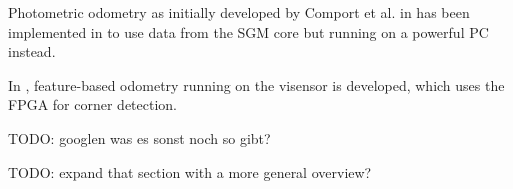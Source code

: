 Photometric odometry as initially developed by Comport et al. in
\cite{comport2007odometry} has been implemented in \cite{omaridenseodometry} to
use data from the SGM core but running on a powerful PC instead.

In \cite{marcin2014odometry}, feature-based odometry running on the visensor is
developed, which uses the FPGA for corner detection.



TODO: googlen was es sonst noch so gibt?

TODO: expand that section with a more general overview?
